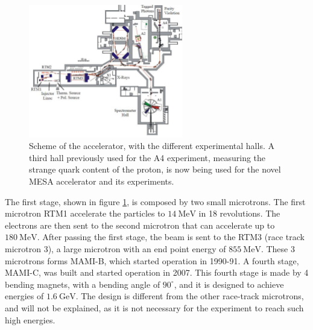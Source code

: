 \begin{figure}[hbtp]
\centering
\includegraphics[width = 0.6\textwidth]{ExperimentalSetup/Accelerator.pdf}
\caption{Scheme of the accelerator, with the different experimental halls. A third hall previously used for the A4 experiment, measuring the strange quark content of the proton, is now being used for the novel MESA accelerator and its experiments.}
\label{fig:Accelerator}
\end{figure}

The first stage, shown in figure \ref{fig:Accelerator}, is composed by two small microtrons. The first microtron RTM1 accelerate the particles to $\SI{14}{\mega \electronvolt}$ in 18 revolutions. The electrons are then sent to the second microtron that can accelerate up to $\SI{180}{\mega \electronvolt}$. After passing the first stage, the beam is sent to the RTM3 (race track microtron 3), a large microtron with an end point energy of $\SI{855}{\mega \electronvolt}$. These 3 microtrons forms MAMI-B, which started operation in 1990-91. A fourth stage, MAMI-C, was built and started operation in 2007. This fourth stage is made by 4 bending magnets, with a bending angle of $90^{\circ}$, and it is designed to achieve energies of $\SI{1.6}{\giga \electronvolt}$. The design is different from the other race-track microtrons, and will not be explained, as it is not necessary for the experiment to reach such high energies.

